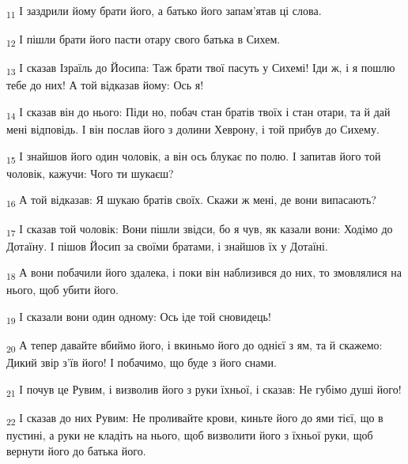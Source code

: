 \begin{tcolorbox}
\textsubscript{11} І заздрили йому брати його, а батько його запам'ятав ці слова.
\end{tcolorbox}
\begin{tcolorbox}
\textsubscript{12} І пішли брати його пасти отару свого батька в Сихем.
\end{tcolorbox}
\begin{tcolorbox}
\textsubscript{13} І сказав Ізраїль до Йосипа: Таж брати твої пасуть у Сихемі! Іди ж, і я пошлю тебе до них! А той відказав йому: Ось я!
\end{tcolorbox}
\begin{tcolorbox}
\textsubscript{14} І сказав він до нього: Піди но, побач стан братів твоїх і стан отари, та й дай мені відповідь. І він послав його з долини Хеврону, і той прибув до Сихему.
\end{tcolorbox}
\begin{tcolorbox}
\textsubscript{15} І знайшов його один чоловік, а він ось блукає по полю. І запитав його той чоловік, кажучи: Чого ти шукаєш?
\end{tcolorbox}
\begin{tcolorbox}
\textsubscript{16} А той відказав: Я шукаю братів своїх. Скажи ж мені, де вони випасають?
\end{tcolorbox}
\begin{tcolorbox}
\textsubscript{17} І сказав той чоловік: Вони пішли звідси, бо я чув, як казали вони: Ходімо до Дотаїну. І пішов Йосип за своїми братами, і знайшов їх у Дотаїні.
\end{tcolorbox}
\begin{tcolorbox}
\textsubscript{18} А вони побачили його здалека, і поки він наблизився до них, то змовлялися на нього, щоб убити його.
\end{tcolorbox}
\begin{tcolorbox}
\textsubscript{19} І сказали вони один одному: Ось іде той сновидець!
\end{tcolorbox}
\begin{tcolorbox}
\textsubscript{20} А тепер давайте вбиймо його, і вкиньмо його до однієї з ям, та й скажемо: Дикий звір з'їв його! І побачимо, що буде з його снами.
\end{tcolorbox}
\begin{tcolorbox}
\textsubscript{21} І почув це Рувим, і визволив його з руки їхньої, і сказав: Не губімо душі його!
\end{tcolorbox}
\begin{tcolorbox}
\textsubscript{22} І сказав до них Рувим: Не проливайте крови, киньте його до ями тієї, що в пустині, а руки не кладіть на нього, щоб визволити його з їхньої руки, щоб вернути його до батька його.
\end{tcolorbox}
